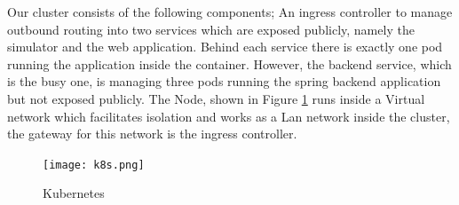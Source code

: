 Our cluster consists of the following components; An ingress controller to manage outbound routing into two services which are exposed publicly, namely the simulator and the web application. Behind each service there is exactly one pod running the application inside the container. However, the backend service, which is the busy one, is managing three pods running the spring backend application but not exposed publicly. The Node, shown in Figure \ref{fig:k8s} runs inside a Virtual network which facilitates isolation and works as a Lan network inside the cluster, the gateway for this network is the ingress controller.

\begin{figure}[h]
    \centering
    \texttt{[image: k8s.png]}
    \caption{Kubernetes}
    \label{fig:k8s}
\end{figure}

